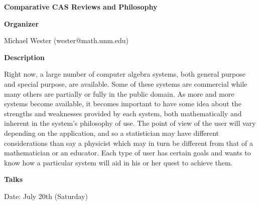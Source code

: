 \begin{center}
{\LARGE \bf Comparative CAS Reviews and Philosophy
}
\end{center}
\bigskip

{\bf Organizer}
\medskip

Michael Wester (wester@math.unm.edu)

\bigskip

{\bf Description}
\medskip

Right now, a large number of computer algebra systems, both general purpose and special purpose,
are available. Some of these systems are commercial while many others are partially or fully in the
public domain. As more and more systems become available, it becomes important to have some
idea about the strengths and weaknesses provided by each system, both mathematically and
inherent in the system's philosophy of use. The point of view of the user will vary depending on
the application, and so a statistician may have different considerations than say a physicist which
may in turn be different from that of a mathematician or an educator. Each type of user has certain
goals and wants to know how a particular system will aid in his or her quest to achieve them. 

\bigskip
{\bf Talks}
\medskip

Date: July 20th (Saturday) 


